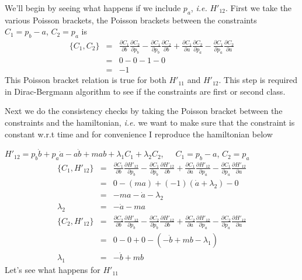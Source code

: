 \documentclass[aps,preprint,preprintnumbers,nofootinbib,showpacs,prd]{revtex4-1}
\newcommand{\ie}{{\it i.e.} }
\newcommand{\nbea}{\begin{eqnarray*}}
\newcommand{\neea}{\end{eqnarray*}}
\begin{document}
We'll begin by seeing what happens if we include $p_a$, \ie $H'_{12}$. First we take the various Poisson brackets, the Poisson brackets between the constraints $C_1 = p_b - a$, $C_2 = p_a$ is
%
\nbea
\{C_1, C_2\} & = & \frac{\partial C_1}{\partial b}\frac{\partial C_2}{\partial p_b} - \frac{\partial C_1}{\partial p_b}\frac{\partial C_2}{\partial b} + \frac{\partial C_1}{\partial a}\frac{\partial C_2}{\partial p_a} - \frac{\partial C_1}{\partial p_a}\frac{\partial C_2}{\partial a} \\
& = & 0 - 0 - 1 - 0 \\
& = & -1
\neea
%
This Poisson bracket relation is true for both $H'_{11}$ and $H'_{12}$. This step is required in Dirac-Bergmann algorithm to see if the constraints are first or second class.

Next we do the consistency checks by taking the Poisson bracket between the constraints and the hamiltonian, \ie we want to make sure that the constraint is constant w.r.t time and for convenience I reproduce the hamiltonian below


$H'_{12} = p_b \dot b + p_a \dot a - a\dot b + mab + \lambda_1 C_1 + \lambda_2 C_2$,~~~$C_1 = p_b - a$, $C_2 = p_a$
%
\nbea
\{C_1, H'_{12}\} & = & \frac{\partial C_1}{\partial b}\frac{\partial H'_{12}}{\partial p_b} - \frac{\partial C_1}{\partial p_b}\frac{\partial H'_{12}}{\partial b} + \frac{\partial C_1}{\partial a}\frac{\partial H'_{12}}{\partial p_a} - \frac{\partial C_1}{\partial p_a}\frac{\partial H'_{12}}{\partial a} \\
& = & 0 - (ma) + (-1) (\dot a + \lambda_2) - 0 \\
& = & -ma - \dot a - \lambda_2 \\
\lambda_2 & = & - \dot a - ma 
\neea
%
%
\nbea
\{C_2, H'_{12}\} & = & \frac{\partial C_2}{\partial b}\frac{\partial H'_{12}}{\partial p_b} - \frac{\partial C_2}{\partial p_b}\frac{\partial H'_{12}}{\partial b} + \frac{\partial C_2}{\partial a}\frac{\partial H'_{12}}{\partial p_a} - \frac{\partial C_2}{\partial p_a}\frac{\partial H'_{12}}{\partial a} \\
& = & 0 - 0 + 0 -(-\dot b + mb - \lambda_1) \\
\lambda_1 & = & - \dot b + mb
\neea
%
Let's see what happens for $H'_{11}$
\end{document}
